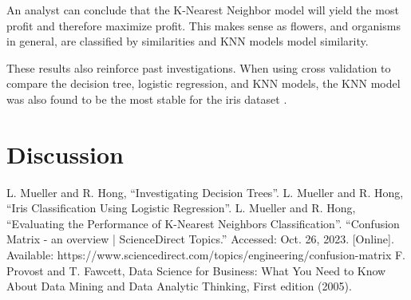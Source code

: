 \documentclass[journal]{IEEEtran}
\begin{document}
An analyst can conclude that the K-Nearest Neighbor model will yield the most profit and therefore maximize profit. This makes sense as flowers, and organisms in general, are classified by similarities and KNN models model similarity. 

These results also reinforce past investigations. When using cross validation to compare the decision tree, logistic regression, and KNN models, the KNN model was also found to be the most stable for the iris dataset \cite{b3}. 

\section{Discussion}
\label{sec:discussion}


\begin{thebibliography}{00}
 L. Mueller and R. Hong, “Investigating Decision Trees”.
 L. Mueller and R. Hong, “Iris Classification Using Logistic Regression”.
 L. Mueller and R. Hong, “Evaluating the Performance of K-Nearest Neighbors Classification”.
 “Confusion Matrix - an overview | ScienceDirect Topics.” Accessed: Oct. 26, 2023. [Online]. Available: https://www.sciencedirect.com/topics/engineering/confusion-matrix
 F. Provost and T. Fawcett, Data Science for Business: What You Need to Know About Data Mining and Data Analytic Thinking, First edition (2005).

\end{thebibliography}
\end{document}
